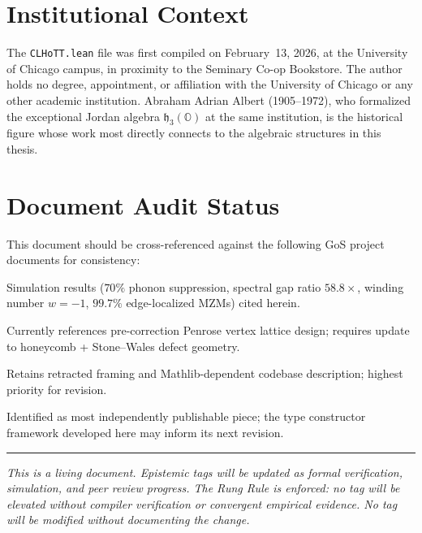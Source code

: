 \documentclass[11pt,letterpaper]{article}
\newcommand{\OO}{\mathbb{O}}
\newcommand{\hthreeO}{\mathfrak{h}_3(\OO)}
\begin{document}
\section{Institutional Context}

The \texttt{CLHoTT.lean} file was first compiled on February~13, 2026, at the University of Chicago campus, in proximity to the Seminary Co-op Bookstore. The author holds no degree, appointment, or affiliation with the University of Chicago or any other academic institution. Abraham Adrian Albert (1905--1972), who formalized the exceptional Jordan algebra $\hthreeO$ at the same institution, is the historical figure whose work most directly connects to the algebraic structures in this thesis.

\section{Document Audit Status}

This document should be cross-referenced against the following GoS project documents for consistency:

\begin{description}[style=nextline, leftmargin=1.5em]
  \item[\textnormal{\textit{PGTC Preprint (REVTeX):}}] Simulation results ($70\%$ phonon suppression, spectral gap ratio $58.8\times$, winding number $w = -1$, $99.7\%$ edge-localized MZMs) cited herein.
  \item[\textnormal{\textit{FWS Engineering Spec:}}] Currently references pre-correction Penrose vertex lattice design; requires update to honeycomb + Stone--Wales defect geometry.
  \item[\textnormal{\textit{Topological Invariants as Dependent Types:}}] Retains retracted framing and Mathlib-dependent codebase description; highest priority for revision.
  \item[\textnormal{\textit{MZM Certification Architecture:}}] Identified as most independently publishable piece; the type constructor framework developed here may inform its next revision.
\end{description}

\vspace{12pt}
\hrule
\vspace{8pt}

\begin{center}
\small\textit{This is a living document. Epistemic tags will be updated as formal verification, simulation, and peer review progress. The Rung Rule is enforced: no tag will be elevated without compiler verification or convergent empirical evidence. No tag will be modified without documenting the change.}
\end{center}
\end{document}

